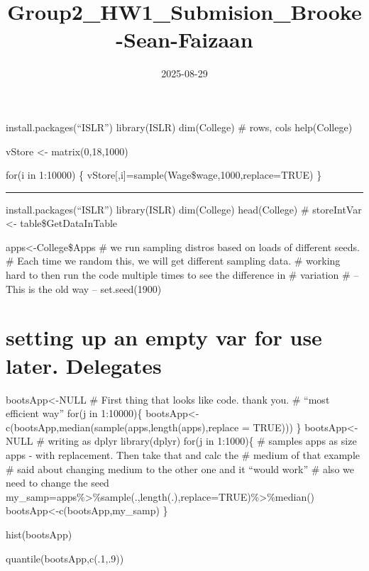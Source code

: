 \documentclass[
]{article}
\title{Group2\_HW1\_Submision\_Brooke-Sean-Faizaan}
\author{}
\date{\vspace{-2.5em}2025-08-29}
\begin{document}
\maketitle

install.packages(``ISLR'') library(ISLR) dim(College) \# rows, cols
help(College)

vStore \textless- matrix(0,18,1000)

for(i in 1:10000) \{ vStore{[},i{]}=sample(Wage\$wage,1000,replace=TRUE)
\}

\begin{center}\rule{0.5\linewidth}{0.5pt}\end{center}

install.packages(``ISLR'') library(ISLR) dim(College) head(College) \#
storeIntVar \textless- table\$GetDataInTable

apps\textless-College\$Apps \# we run sampling distros based on loads of
different seeds. \# Each time we random this, we will get different
sampling data. \# working hard to then run the code multiple times to
see the difference in \# variation \# -- This is the old way --
set.seed(1900)

\section{setting up an empty var for use later.
Delegates}\label{setting-up-an-empty-var-for-use-later.-delegates}

bootsApp\textless-NULL \# First thing that looks like code. thank you.
\# ``most efficient way'' for(j in 1:10000)\{
bootsApp\textless-c(bootsApp,median(sample(apps,length(apps),replace =
TRUE))) \} bootsApp\textless-NULL \# writing as dplyr library(dplyr)
for(j in 1:1000)\{ \# samples apps as size apps - with replacement. Then
take that and calc the \# medium of that example \# said about changing
medium to the other one and it ``would work'' \# also we need to change
the seed
my\_samp=apps\%\textgreater\%sample(.,length(.),replace=TRUE)\%\textgreater\%median()
bootsApp\textless-c(bootsApp,my\_samp) \}

hist(bootsApp)

quantile(bootsApp,c(.1,.9))
\end{document}
